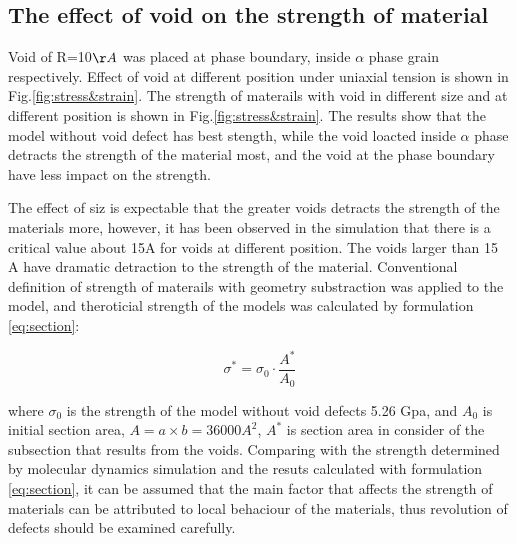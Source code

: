 \documentclass[journal,article,submit,moreauthors,pdftex,10pt,a4paper]{Definitions/mdpi}
\begin{document}
\subsection{The effect of void on the strength of material}

Void of R=10$\AA$ was placed at phase boundary, inside $\alpha$ phase grain respectively. Effect of void at different position under uniaxial tension is shown in Fig.\ref{fig:stress&strain}. The strength of materails with void in different size and at different position is shown in Fig.\ref{fig:stress&strain}. The results show that the model without void defect has best stength, while the void loacted inside $\alpha$ phase detracts the strength of the material most, and the void at the phase boundary have less impact on the strength.
	
The effect of siz is expectable that the greater voids detracts the strength of the materials more, however, it has been observed in the simulation that there is a critical value about 15A for voids at different position. The voids larger than 15 A have dramatic detraction to the strength of the material. Conventional definition of strength of materails with geometry substraction was applied to the model, and theroticial strength of the models was calculated by formulation \ref{eq:section}:
	
	\begin{equation} \label{eq:section} 
	\sigma^* = \sigma_0 \cdot \frac{A^*}{A_0}
	\end{equation}
	
where $\sigma_0$ is the strength of the model without void defects 5.26 Gpa, and $A_0$ is initial section area, $ A = a\times b = 36000 A^2$, $A^* $ is section area in consider of the subsection that results from the voids. Comparing with the strength determined by molecular dynamics simulation and the resuts calculated with formulation \ref{eq:section}, it can be assumed that the main factor that affects the strength of materials can be attributed to local behaciour of the materials, thus revolution of defects should be examined carefully.
	
\end{document}

